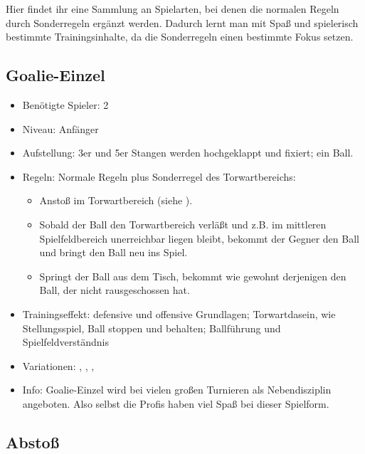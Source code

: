 Hier findet ihr eine Sammlung an Spielarten, bei denen die normalen Regeln durch Sonderregeln ergänzt werden. 
Dadurch lernt man mit Spaß und spielerisch bestimmte Trainingsinhalte, da die Sonderregeln einen bestimmte Fokus setzen. 

\subsection{Goalie-Einzel}
\label{spielformen:sonderregeln:goalie}

\begin{itemize}
\item Benötigte Spieler: 2
\item Niveau: Anfänger
\item Aufstellung: 3er und 5er Stangen werden hochgeklappt und fixiert; ein Ball.
\item Regeln: Normale Regeln plus Sonderregel des Torwartbereichs: 
  \begin{itemize}
  \item Anstoß im Torwartbereich (siehe ).
  \item Sobald der Ball den Torwartbereich verläßt und z.B. im mittleren Spielfeldbereich unerreichbar liegen bleibt, bekommt der Gegner den Ball und bringt den Ball neu ins Spiel.
  \item Springt der Ball aus dem Tisch, bekommt wie gewohnt derjenigen den Ball, der nicht rausgeschossen hat. 
  \end{itemize}
\item Trainingseffekt: defensive und offensive Grundlagen; Torwartdasein, wie Stellungsspiel, Ball stoppen und behalten; Ballführung und Spielfeldverständnis
\item Variationen: , , , 
\item Info: Goalie-Einzel wird bei vielen großen Turnieren als Nebendisziplin angeboten. Also selbst die Profis haben viel Spaß bei dieser Spielform.
\end{itemize}


\subsection{Abstoß}
\label{spielformen:sonderregeln:abstoss}

